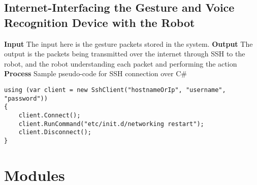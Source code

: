 \subsection{Internet-Interfacing the Gesture and Voice Recognition Device with the Robot}
\textbf{Input}\newline
The input here is the gesture packets stored in the system. \newline
\textbf{Output}\newline
The output is the packets being transmitted over the internet through SSH to the robot, and the robot understanding each packet and performing the action\newline
\textbf{Process}\newline
Sample pseudo-code for SSH connection over C\#
\begin{lstlisting}
using (var client = new SshClient("hostnameOrIp", "username", "password"))
{
    client.Connect();
    client.RunCommand("etc/init.d/networking restart");
    client.Disconnect();
}
\end{lstlisting}


\section{Modules}
